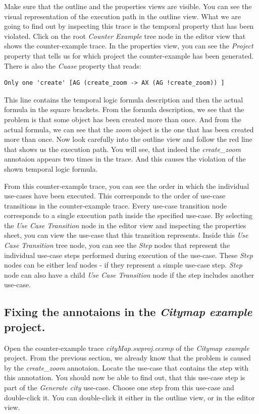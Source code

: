 Make sure that the outline and the properties views are visible. You can see the visual representation of the execution path in the
outline view. What we are going to find out by inspecting this trace is the temporal property that has been violated.
Click on the root \emph{Counter Example} tree node in the editor view that shows the counter-example trace. In the properties view,
you can see the \emph{Project} property that tells us for which project the counter-example has been generated. There is also the
\emph{Cuase} property that reads:
\begin{verbatim}
Only one 'create' [AG (create_zoom -> AX (AG !create_zoom)) ]
\end{verbatim}
This line contains the temporal logic formula description and then the actual formula in the square brackets. From the formula
description, we see that the problem is that some object has been created more than once. And from the actual formula, we can
see that the \emph{zoom} object is the one that has been created more than once. Now look carefully into the outline view and
follow the red line that shows us the execution path. You will see, that indeed the \emph{create\_zoom} annotaion appears two times
in the trace. And this causes the violation of the shown temporal logic formula.

From this counter-example trace, you can see the order in which the individual use-cases have been executed. This corresponds to the
order of use-case transitions in the counter-example trace. Every use-case transition node corresponds to a single execution path inside
the specified use-case. By selecting the \emph{Use Case Transition} node in the editor view and inspecting the properties sheet, you can
view the use-case that this transition represents. Inside this \emph{Use Case Transition} tree node, you can see the \emph{Step} nodes
that represent the individual use-case steps performed during execution of the use-case. These \emph{Step} nodes can be either leaf
nodes - if they represent a simple use-case step. \emph{Step} node can also have a child \emph{Use Case Transition} node if the step
includes another use-case.

\subsection{Fixing the annotaions in the \emph{Citymap example} project.}

Open the counter-example trace \emph{cityMap.swproj.cexmp} of the \emph{Citymap example} project. From the previous section, we already
know that the problem is caused by the \emph{create\_zoom} annotaion. Locate the use-case that contains the step with this annotation.
You should now be able to find out, that this use-case step is part of the \emph{Generate city} use-case. Choose one step from this
use-case and double-click it. You can double-click it either in the outline view, or in the editor view.

